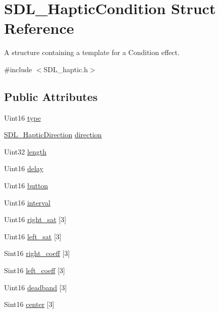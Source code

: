 \hypertarget{struct_s_d_l___haptic_condition}{}\section{S\+D\+L\+\_\+\+Haptic\+Condition Struct Reference}
\label{struct_s_d_l___haptic_condition}


A structure containing a template for a Condition effect.  




{\ttfamily \#include $<$S\+D\+L\+\_\+haptic.\+h$>$}

\subsection*{Public Attributes}
\begin{DoxyCompactItemize}
\item 
Uint16 \mbox{\hyperlink{struct_s_d_l___haptic_condition_a7be55a9a86c05dd1a54a3006781cfa6f}{type}}
\item 
\mbox{\hyperlink{struct_s_d_l___haptic_direction}{S\+D\+L\+\_\+\+Haptic\+Direction}} \mbox{\hyperlink{struct_s_d_l___haptic_condition_a728507d30d18998949313de3a25e5581}{direction}}
\item 
Uint32 \mbox{\hyperlink{struct_s_d_l___haptic_condition_ad0efb0a6ddc20f058e87199eaaa95978}{length}}
\item 
Uint16 \mbox{\hyperlink{struct_s_d_l___haptic_condition_aad40417980530ca8d80c62ba864a090b}{delay}}
\item 
Uint16 \mbox{\hyperlink{struct_s_d_l___haptic_condition_acd35a9d432ad122bf7824b16974eac7a}{button}}
\item 
Uint16 \mbox{\hyperlink{struct_s_d_l___haptic_condition_aafc182abea1078bed7e9cf5d0e713ea2}{interval}}
\item 
Uint16 \mbox{\hyperlink{struct_s_d_l___haptic_condition_a90427a1e0d464b4b53abc1d419c97b2e}{right\+\_\+sat}} \mbox{[}3\mbox{]}
\item 
Uint16 \mbox{\hyperlink{struct_s_d_l___haptic_condition_a953448774c40818a4f47c6efea21124d}{left\+\_\+sat}} \mbox{[}3\mbox{]}
\item 
Sint16 \mbox{\hyperlink{struct_s_d_l___haptic_condition_a3de7f164ef88841255535387d0f100b6}{right\+\_\+coeff}} \mbox{[}3\mbox{]}
\item 
Sint16 \mbox{\hyperlink{struct_s_d_l___haptic_condition_a2adf52c32f60f0b6826b1e3add2eae7a}{left\+\_\+coeff}} \mbox{[}3\mbox{]}
\item 
Uint16 \mbox{\hyperlink{struct_s_d_l___haptic_condition_af684c8eeeb719739a32723c00c5a2bbd}{deadband}} \mbox{[}3\mbox{]}
\item 
Sint16 \mbox{\hyperlink{struct_s_d_l___haptic_condition_a8a71ec28ff5ab85246cbc59736aa2c53}{center}} \mbox{[}3\mbox{]}
\end{DoxyCompactItemize}


